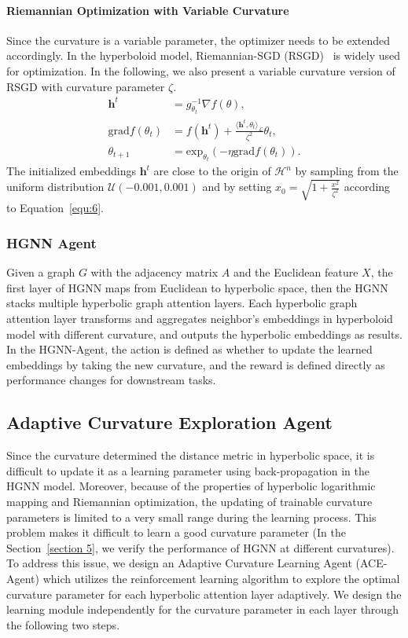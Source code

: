 \paragraph{Riemannian Optimization with Variable Curvature}
Since the curvature is a variable parameter, the optimizer needs to be extended accordingly. 
In the hyperboloid model, Riemannian-SGD (RSGD)~\cite{DBLP:conf/icml/NickelK18} is widely used for optimization. 
In the following, we also present a variable curvature version of RSGD with curvature parameter $\zeta$. 
\begin{equation}
\begin{aligned}
    \mathbf{h}^t & = g_{\theta_t}^{-1} \nabla f(\theta), \\ 
    \mathrm{grad}f(\theta_t) & = f(\mathbf{h}^t) + \frac{\langle \mathbf{h}^t,\theta_t \rangle_{\mathcal{L}}}{\zeta^2}\theta_t,  \\ 
    \theta_{t+1} & = \mathrm{exp}_{\theta_t}(-\eta \mathrm{grad}f(\theta_t)).
\end{aligned}
\end{equation}
The initialized embeddings $\mathbf{h}^t$ are close to the origin of $\mathcal{H}^n$ by sampling from the uniform distribution $\mathcal{U}(-0.001, 0.001)$ and by setting $x_0 = \sqrt{1+\frac{x^2}{\zeta^2}}$ according to Equation~\eqref{equ:6}.

\subsubsection{HGNN Agent}
Given a graph $G$ with the adjacency matrix $A$ and the Euclidean feature $X$, the ﬁrst layer of HGNN maps from Euclidean to hyperbolic space, then the HGNN stacks multiple hyperbolic graph attention layers.  
Each hyperbolic graph attention layer transforms and aggregates neighbor’s embeddings in hyperboloid model with different curvature, and outputs the hyperbolic embeddings as results.
In the HGNN-Agent, the action is defined as whether to update the learned embeddings by taking the new curvature, and the reward is defined directly as performance changes for downstream tasks.

\subsection{Adaptive Curvature Exploration Agent}
Since the curvature determined the distance metric in hyperbolic space, it is difficult to update it as a learning parameter using back-propagation in the HGNN model. 
Moreover, because of the properties of hyperbolic logarithmic mapping and Riemannian optimization, the updating of trainable curvature parameters is limited to a very small range during the learning process. 
This problem makes it difficult to learn a good curvature parameter (In the Section~\ref{section 5}, we verify the performance of HGNN at different curvatures).
To address this issue, we design an Adaptive Curvature Learning Agent (ACE-Agent) which utilizes the reinforcement learning algorithm to explore the optimal curvature parameter for each hyperbolic attention layer adaptively. 
We design the learning module independently for the curvature parameter in each layer through the following two steps. 

